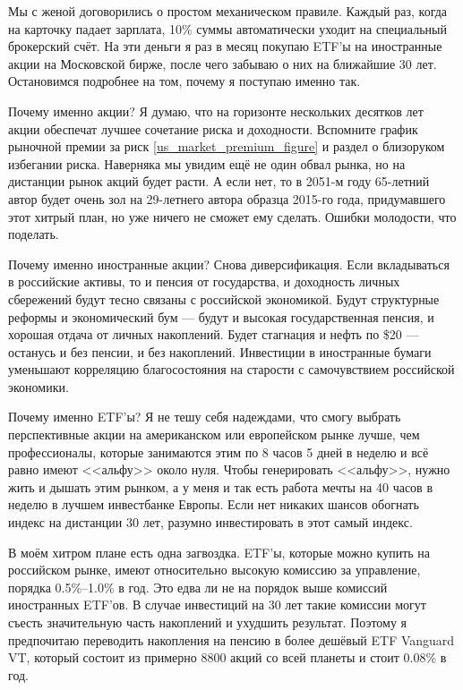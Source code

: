 Мы с женой договорились о простом механическом правиле. Каждый раз, когда на 
карточку падает зарплата, 10\% суммы автоматически уходит на специальный 
брокерский счёт. На эти деньги я раз в месяц покупаю ETF'ы на иностранные акции 
на Московской бирже, после чего забываю о них на ближайшие 30 лет. Остановимся 
подробнее на том, почему я поступаю именно так.
 
Почему именно акции? Я думаю, что на горизонте нескольких десятков лет акции 
обеспечат лучшее сочетание риска и доходности. Вспомните график рыночной премии 
за риск \ref{us_market_premium_figure} и раздел о близоруком избегании риска. 
Наверняка мы увидим ещё не один обвал рынка, но на дистанции рынок акций будет 
расти. А если нет, то в 2051\nobreakdash-м году 65\nobreakdash-летний автор 
будет очень зол на 29\nobreakdash-летнего автора образца 2015\nobreakdash-го 
года, придумавшего этот хитрый план, но уже ничего не сможет ему сделать. 
Ошибки молодости, что поделать.

Почему именно иностранные акции? Снова диверсификация. Если вкладываться в 
российские активы, то и пенсия от государства, и доходность личных сбережений 
будут тесно связаны с российской экономикой. Будут структурные реформы и 
экономический бум --- будут и высокая государственная пенсия, и хорошая отдача 
от личных накоплений. Будет стагнация и нефть по \$20 --- останусь и без 
пенсии, и без накоплений. Инвестиции в иностранные бумаги уменьшают корреляцию 
благосостояния на старости с самочувствием российской экономики.

Почему именно ETF'ы? Я не тешу себя надеждами, что смогу выбрать перспективные 
акции на американском или европейском рынке лучше, чем профессионалы, которые 
занимаются этим по 8 часов 5 дней в неделю и всё равно имеют <<альфу>> около 
нуля. Чтобы генерировать <<альфу>>, нужно жить и дышать этим рынком, а у меня и 
так есть работа мечты на 40 часов в неделю в лучшем инвестбанке Европы. Если 
нет никаких шансов обогнать индекс на дистанции 30 лет, разумно инвестировать в 
этот самый индекс.

В моём хитром плане есть одна загвоздка. ETF'ы, которые можно купить на 
российском рынке, имеют относительно высокую комиссию за управление, порядка 
0.5\%--1.0\% в год. Это едва ли не на порядок выше комиссий иностранных ETF'ов. 
В случае инвестиций на 30 лет такие комиссии могут съесть значительную часть 
накоплений и ухудшить результат. Поэтому я предпочитаю переводить накопления на 
пенсию в более дешёвый ETF Vanguard VT, который состоит из примерно 8800 акций 
со всей планеты и стоит 0.08\% в год.

